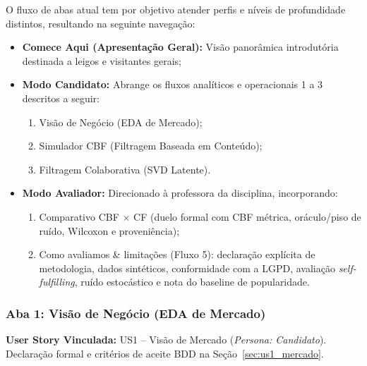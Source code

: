 O fluxo de abas atual tem por objetivo atender perfis e níveis de profundidade distintos, resultando na seguinte navegação:
\begin{itemize}
    \item \textbf{Comece Aqui (Apresentação Geral):} Visão panorâmica introdutória destinada a leigos e visitantes gerais;
    \item \textbf{Modo Candidato:} Abrange os fluxos analíticos e operacionais 1 a 3 descritos a seguir:
    \begin{enumerate}[label=\arabic*.]
        \item Visão de Negócio (EDA de Mercado);
        \item Simulador CBF (Filtragem Baseada em Conteúdo);
        \item Filtragem Colaborativa (SVD Latente).
    \end{enumerate}
    \item \textbf{Modo Avaliador:} Direcionado à professora da disciplina, incorporando:
    \begin{enumerate}[label=\arabic*., start=4]
        \item Comparativo CBF $\times$ CF (duelo formal com CBF métrica, oráculo/piso de ruído, Wilcoxon e proveniência);
        \item Como avaliamos \& limitações (Fluxo 5): declaração explícita de metodologia, dados sintéticos, conformidade com a LGPD, avaliação \textit{self-fulfilling}, ruído estocástico e nota do baseline de popularidade.
    \end{enumerate}
\end{itemize}

\subsubsection{Aba 1: Visão de Negócio (EDA de Mercado)}

\noindent\textbf{User Story Vinculada:} US1 -- Visão de Mercado (\textit{Persona: Candidato}).
Declaração formal e critérios de aceite BDD na Seção~\ref{sec:us1_mercado}.

